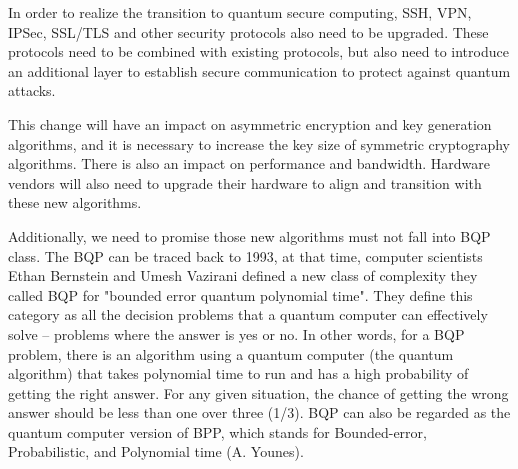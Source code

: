 \documentclass[sigconf]{acmart}
\begin{document}
In order to realize the transition to quantum secure computing, SSH, VPN, IPSec, SSL/TLS and other security protocols also need to be upgraded. These protocols need to be combined with existing protocols, but also need to introduce an additional layer to establish secure communication to protect against quantum attacks.

This change will have an impact on asymmetric encryption and key generation algorithms, and it is necessary to increase the key size of symmetric cryptography algorithms. There is also an impact on performance and bandwidth. Hardware vendors will also need to upgrade their hardware to align and transition with these new algorithms.

Additionally, we need to promise those new algorithms must not fall into BQP class. The BQP can be traced back to 1993, at that time, computer scientists Ethan Bernstein and Umesh Vazirani defined a new class of complexity they called BQP for "bounded error quantum polynomial time". They define this category as all the decision problems that a quantum computer can effectively solve -- problems where the answer is yes or no. In other words, for a BQP problem, there is an algorithm using a quantum computer (the quantum algorithm) that takes polynomial time to run and has a high probability of getting the right answer. For any given situation, the chance of getting the wrong answer should be less than one over three (1/3). BQP can also be regarded as the quantum computer version of BPP, which stands for Bounded-error, Probabilistic, and Polynomial time (A. Younes). 
\end{document}
